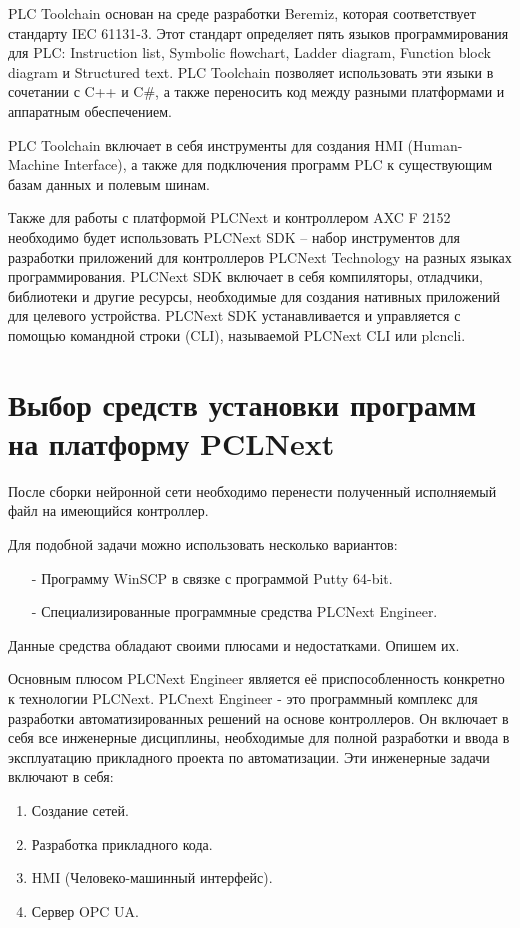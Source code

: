PLC Toolchain основан на среде разработки Beremiz, которая соответствует стандарту IEC 61131-3. Этот стандарт определяет пять языков программирования для PLC: Instruction list, Symbolic flowchart, Ladder diagram, Function block diagram и Structured text. PLC Toolchain позволяет использовать эти языки в сочетании с C++ и C\#, а также переносить код между разными платформами и аппаратным обеспечением.

PLC Toolchain включает в себя инструменты для создания HMI (Human-Machine Interface), а также для подключения программ PLC к существующим базам данных и полевым шинам. 

Также для работы с платформой PLCNext и контроллером AXC F 2152 необходимо будет использовать PLCNext SDK – набор инструментов для разработки приложений для контроллеров PLCNext Technology на разных языках программирования. PLCNext SDK включает в себя компиляторы, отладчики, библиотеки и другие ресурсы, необходимые для создания нативных приложений для целевого устройства. PLCNext SDK устанавливается и управляется с помощью командной строки (CLI), называемой PLCNext CLI или plcncli.

\section{Выбор средств установки программ на платформу PCLNext}

После сборки нейронной сети необходимо перенести полученный исполняемый файл на имеющийся контроллер.

Для подобной задачи можно использовать несколько вариантов:

\begin{itemize}
    \item[-] Программу WinSCP в связке с программой Putty 64-bit.
    \item[-] Специализированные программные средства PLCNext Engineer.
\end{itemize}

Данные средства обладают своими плюсами и недостатками. Опишем их. 

Основным плюсом PLCNext Engineer является её приспособленность конкретно к технологии PLCNext. PLCnext Engineer - это программный комплекс для разработки автоматизированных решений на основе контроллеров. Он включает в себя все инженерные дисциплины, необходимые для полной разработки и ввода в эксплуатацию прикладного проекта по автоматизации. Эти инженерные задачи включают в себя:

\begin{enumerate}
    \item Создание сетей.
    \item Разработка прикладного кода.
    \item HMI (Человеко-машинный интерфейс).
    \item Сервер OPC UA.
\end{enumerate}

